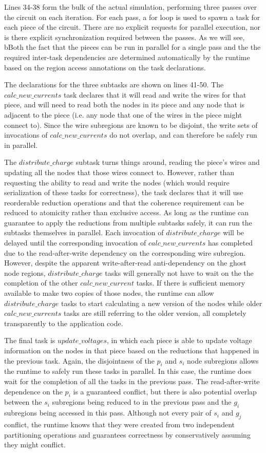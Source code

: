Lines 34-38 form the bulk of the actual simulation, performing three passes
over the circuit on each iteration.  For each pass, a for loop is used to 
spawn a task for each piece of the circuit.  There are no explicit requests for
parallel execution, nor is there explicit synchronization required between the
passes.  As we will see, bBoth the fact that the pieces can be run in parallel
for a single 
pass and the the required inter-task dependencies are determined automatically
by the runtime based on the region access annotations on the task declarations.

The declarations for the three subtasks are shown on lines 41-50.  The 
$calc\_new\_currents$ task declares that it will read and write the wires
for that piece, and will need to read both the nodes in its piece and any
node that is adjacent to the piece (i.e. any node that one of the wires in the
piece might connect to).  Since the wire subregions are known to be disjoint,
the write sets of invocations of $calc\_new\_currents$ do not overlap, and can
therefore be safely run in parallel.

The $distribute\_charge$ subtask turns things around, reading the piece's 
wires and updating all the nodes that those wires connect to.  However,
rather than requesting the ability to read and write the nodes (which would
require serialization of these tasks for correctness), the task declares that
it will use reorderable reduction operations and that the coherence requirement
can be reduced to atomicity rather than exclusive access.  As long as the
runtime can guarantee to apply the reductions from multiple subtasks safely, it
can run the subtasks themselves in parallel.  Each invocation of 
$distribute\_charge$ will be delayed until the corresponding invocation of 
$calc\_new\_currents$ has completed due to the read-after-write dependency on
the corresponding wire subregion.  However, despite the apparent 
write-after-read anti-dependency on the ghost node regions, $distribute\_charge$
tasks will generally not have to wait on the the completion of the other
$calc\_new\_current$ tasks.  If there is sufficient memory available to make
two copies of those nodes, the runtime can allow $distribute\_charge$ tasks to
start calculating a new version of the nodes while older $calc\_new\_currents$
tasks are still referring to the older version, all completely transparently to
the application code.

The final task is $update\_voltages$, in which each piece is able to update
voltage information on the nodes in that piece based on the reductions that
happened in the previous task.  Again, the disjointness of the $p_i$ and $s_i$
node subregions allows the runtime to safely run these tasks in parallel.  In
this case, the runtime does wait for the completion of all the tasks in the 
previous pass.  The read-after-write dependence on the $p_i$ is a guaranteed
conflict, but there is also potential overlap between the $s_i$ subregions
being reduced to in the previous pass and the $g_i$ subregions being accessed
in this pass.  Although not every pair of $s_i$ and $g_j$ conflict, the
runtime knows that they were created from two independent partitioning
operations and guarantees correctness by conservatively assuming they might
conflict.

%
%
